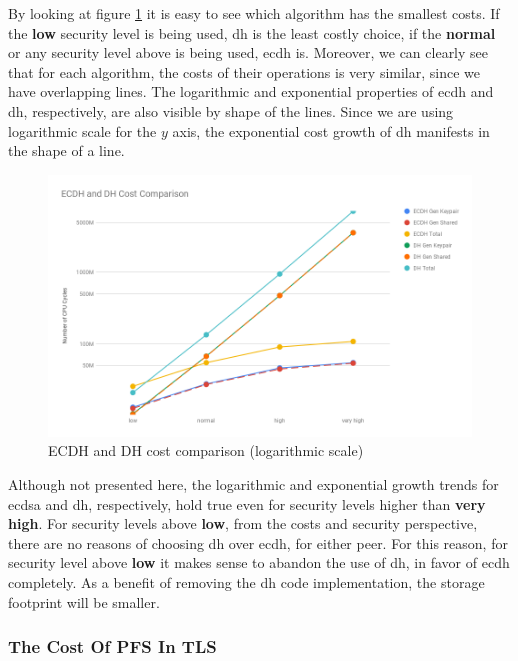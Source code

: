 \documentclass{llncs}
\begin{document}
By looking at figure \ref{fig:ecdh-dh-costs-all} it is easy to see which algorithm has the smallest costs. If the \textbf{low} security level is being used,
\gls{dh} is the least costly choice, if the \textbf{normal} or any security level above is being used, \gls{ecdh} is. Moreover, we can clearly see that
for each algorithm, the costs of their operations is very similar, since we have overlapping lines. The logarithmic and exponential properties of
\gls{ecdh} and \gls{dh}, respectively, are also visible by shape of the lines. Since we are using logarithmic scale for the $y$ axis, the
exponential cost growth of \gls{dh} manifests in the shape of a line.

\begin{figure}
  \centering
  \includegraphics[width=1.0\textwidth]{img/ecdh_dh_costs_all.png}
  \centering \caption{\label{fig:ecdh-dh-costs-all} ECDH and DH cost comparison (logarithmic scale)}
\end{figure}

Although not presented here, the logarithmic and exponential growth trends for \gls{ecdsa} and \gls{dh}, respectively, hold true even for
security levels higher than \textbf{very high}. For security levels above \textbf{low}, from the costs and security perspective, there are no
reasons of choosing \gls{dh} over \gls{ecdh}, for either peer. For this reason, for security level above \textbf{low} it makes sense to abandon the
use of \gls{dh}, in favor of \gls{ecdh} completely. As a benefit of removing the \gls{dh} code implementation, the storage footprint will be smaller.


\subsubsection{The Cost Of PFS In TLS} \label{sec:pfs-cost-in-tls}
\end{document}
